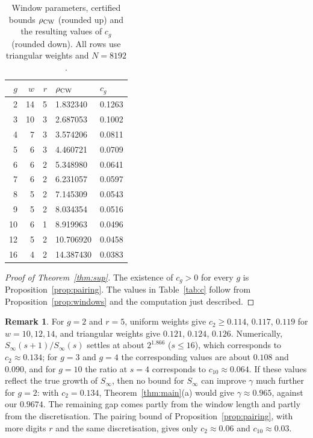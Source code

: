 \documentclass[11pt]{amsart}
\theoremstyle{definition}
\newtheorem{remark}[theorem]{Remark}
\numberwithin{equation}{section}
\newcommand{\Sinf}{S_\infty}
\begin{document}
\begin{table}[ht]
\caption{Window parameters, certified bounds $\rho_{\rm CW}$ (rounded up)
and the resulting values of $c_g$ (rounded down). All rows use triangular
weights and $N=8192$.}\label{tab:rho}
\small
\begin{tabular}{@{}rrrll@{}}
\toprule
$g$ & $w$ & $r$ & $\rho_{\rm CW}$ & $c_g$\\
\midrule
2 & 14 & 5 & 1.832340 & 0.1263\\
3 & 10 & 3 & 2.687053 & 0.1002\\
4 & 7 & 3 & 3.574206 & 0.0811\\
5 & 6 & 3 & 4.460721 & 0.0709\\
6 & 6 & 2 & 5.348980 & 0.0641\\
7 & 6 & 2 & 6.231057 & 0.0597\\
8 & 5 & 2 & 7.145309 & 0.0543\\
9 & 5 & 2 & 8.034354 & 0.0516\\
10 & 6 & 1 & 8.919963 & 0.0496\\
12 & 5 & 2 & 10.706920 & 0.0458\\
16 & 4 & 2 & 14.387430 & 0.0383\\
\bottomrule
\end{tabular}
\end{table}

\begin{proof}[Proof of Theorem~\ref{thm:sup}]
The existence of $c_g>0$ for every $g$ is Proposition~\ref{prop:pairing}.
The values in Table~\ref{tab:c} follow from Proposition~\ref{prop:windows}
and the computation just described.
\end{proof}

\begin{remark}\label{rem:sharp}
For $g=2$ and $r=5$, uniform weights give $c_2\ge0.114$, $0.117$, $0.119$
for $w=10,12,14$, and triangular weights give $0.121$, $0.124$, $0.126$.
Numerically, $\Sinf(s+1)/\Sinf(s)$ settles at about $2^{1.866}$
($s\le16$), which corresponds to $c_2\approx0.134$; for $g=3$ and $g=4$ the
corresponding values are about $0.108$ and $0.090$, and for $g=10$ the
ratio at $s=4$ corresponds to $c_{10}\approx0.064$. If these values
reflect the true growth of $\Sinf$, then no bound for $\Sinf$ can improve
$\gamma$ much further for $g=2$: with $c_2=0.134$,
Theorem~\ref{thm:main}(a) would give $\gamma\approx0.965$, against our
$0.9674$. The remaining gap comes partly from the window length and partly
from the discretisation. The pairing bound of
Proposition~\ref{prop:pairing}, with more digits $r$ and the same
discretisation, gives only $c_2\approx0.06$ and $c_{10}\approx0.03$.
\end{remark}
\end{document}
